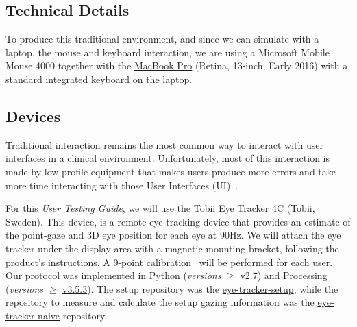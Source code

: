 \subsection{Technical Details}

To produce this traditional environment, and since we can simulate with a laptop, the mouse and keyboard interaction, we are using a Microsoft Mobile Mouse 4000 together with the \hyperlink{https://www.apple.com/shop/buy-mac/macbook-pro}{MacBook Pro} (Retina, 13-inch, Early 2016) with a standard integrated keyboard on the laptop.


\subsection{Devices}

Traditional interaction remains the most common way to interact with user interfaces in a clinical environment. Unfortunately, most of this interaction is made by low profile equipment that makes users produce more errors and take more time interacting with those User Interfaces (UI)~\cite{lopes2018interaction, paulo3d, sousa2017vrrrroom}.

For this \textit{User Testing Guide}, we will use the \hyperlink{https://gaming.tobii.com/product/tobii-eye-tracker-4c/}{Tobii Eye Tracker 4C} (\hyperlink{https://www.tobii.com/}{Tobii}, Sweden). This device, is a remote eye tracking device that provides an estimate of the point-gaze and 3D eye position for each eye at 90Hz. We will attach the eye tracker under the display area with a magnetic mounting bracket, following the product's instructions. A 9-point calibration~\cite{chatelain2018evaluation} will be performed for each user. Our protocol was implemented in \hyperlink{https://www.python.org/}{Python} (\textit{versions} $\geqslant$ \hyperlink{https://docs.python.org/2/}{v2.7}) and \hyperlink{http://www.processing.org/}{Processing} (\textit{versions} $\geqslant$ \hyperlink{https://github.com/processing/processing/releases/tag/processing-0269-3.5.3}{v3.5.3}). The setup repository was the \hyperlink{https://github.com/mida-project/eye-tracker-setup}{eye-tracker-setup}, while the repository to measure and calculate the setup gazing information was the \hyperlink{https://github.com/mida-project/eye-tracker-naive}{eye-tracker-naive} repository.

